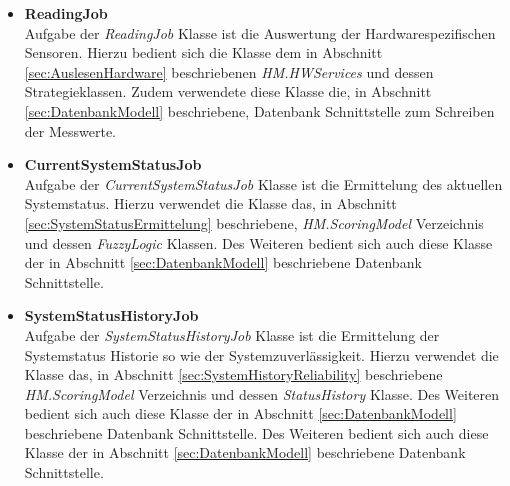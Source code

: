 \begin{itemize}
    \item \textbf{ReadingJob}\\
    Aufgabe der \textit{ReadingJob} Klasse ist die Auswertung der Hardwarespezifischen Sensoren. Hierzu bedient sich die Klasse dem in Abschnitt \ref{sec:AuslesenHardware} beschriebenen \textit{HM.HWServices} und dessen Strategieklassen. Zudem verwendete diese Klasse die, in Abschnitt \ref{sec:DatenbankModell} beschriebene, Datenbank Schnittstelle zum Schreiben der Messwerte. 
    \item \textbf{CurrentSystemStatusJob}\\
    Aufgabe der \textit{CurrentSystemStatusJob} Klasse ist die Ermittelung des aktuellen Systemstatus. Hierzu verwendet die Klasse das, in Abschnitt \ref{sec:SystemStatusErmittelung} beschriebene, \textit{HM.ScoringModel} Verzeichnis und dessen \textit{FuzzyLogic} Klassen. Des Weiteren bedient sich auch diese Klasse der in Abschnitt \ref{sec:DatenbankModell} beschriebene Datenbank Schnittstelle.
    \item \textbf{SystemStatusHistoryJob}\\
    Aufgabe der \textit{SystemStatusHistoryJob} Klasse ist die Ermittelung der Systemstatus Historie so wie der Systemzuverlässigkeit. Hierzu verwendet die Klasse das, in Abschnitt \ref{sec:SystemHistoryReliability} beschriebene \textit{HM.ScoringModel} Verzeichnis und dessen \textit{StatusHistory} Klasse. Des Weiteren bedient sich auch diese Klasse der in Abschnitt \ref{sec:DatenbankModell} beschriebene Datenbank Schnittstelle. Des Weiteren bedient sich auch diese Klasse der in Abschnitt \ref{sec:DatenbankModell} beschriebene Datenbank Schnittstelle.    
\end{itemize}
